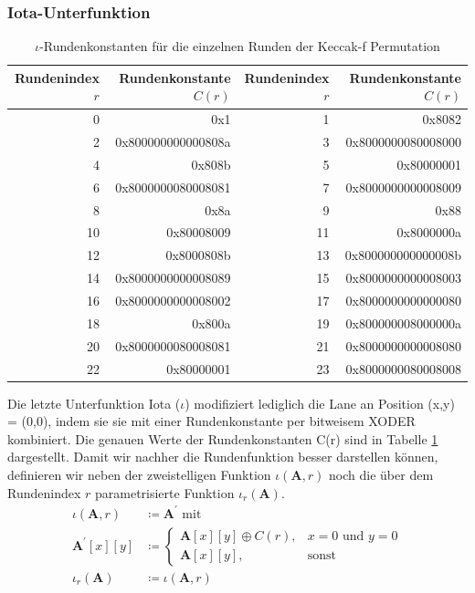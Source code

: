 \subsubsection{Iota-Unterfunktion}
\begin{table}
	\centering
	\begin{tabular}{rrrr}
		Rundenindex $r$ & Rundenkonstante $C(r)$ & Rundenindex $r$ & Rundenkonstante $C(r)$\\
		\hline
		 0 & 0x1 &
		 1 & 0x8082\\
		 2 & 0x800000000000808a &
		 3 & 0x8000000080008000\\
		 4 & 0x808b &
		 5 & 0x80000001\\
		 6 & 0x8000000080008081 &
		 7 & 0x8000000000008009\\
		 8 & 0x8a &
		 9 & 0x88\\
		10 & 0x80008009 &
		11 & 0x8000000a\\
		12 & 0x8000808b &
		13 & 0x800000000000008b\\
		14 & 0x8000000000008089 &
		15 & 0x8000000000008003\\
		16 & 0x8000000000008002 &
		17 & 0x8000000000000080\\
		18 & 0x800a &
		19 & 0x800000008000000a\\
		20 & 0x8000000080008081 &
		21 & 0x8000000000008080\\
		22 & 0x80000001 &
		23 & 0x8000000080008008
	\end{tabular}
	\caption{$\iota$-Rundenkonstanten für die einzelnen Runden der Keccak-f Permutation}
	\label{tab:rundenkonstanten}
\end{table}
Die letzte Unterfunktion Iota ($\iota$) modifiziert lediglich die Lane an Position (x,y) = (0,0), indem sie sie mit einer Rundenkonstante per bitweisem XODER kombiniert.
Die genauen Werte der Rundenkonstanten C(r) sind in Tabelle \ref{tab:rundenkonstanten} dargestellt.
Damit wir nachher die Rundenfunktion besser darstellen können, definieren wir neben der zweistelligen Funktion
$\iota (\textbf{A}, r)$ noch die über dem Rundenindex $r$ parametrisierte Funktion $\iota_r (\textbf{A})$.
\begin{align*}
    \iota (\textbf{A}, r) & \coloneq \textbf{A}^\prime \text{ mit } \\
    \textbf{A}^\prime[x][y] & \coloneq
    \begin{cases}
        \textbf{A}[x][y] \oplus C(r), & x = 0 \text{ und } y = 0 \\
        \textbf{A}[x][y], & \text{sonst}
    \end{cases} \\
    \iota_r (\textbf{A}) & \coloneq \iota(\textbf{A}, r)
\end{align*}

